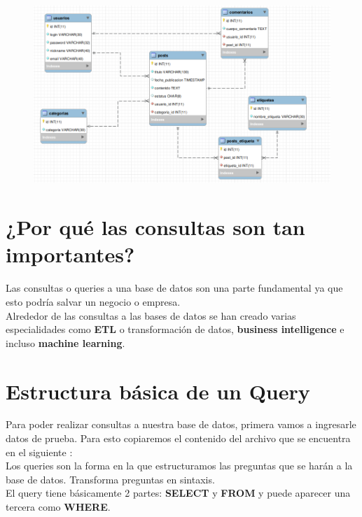 \documentclass{article}
\begin{document}
\newpage

\begin{figure}[h!]
  \centering
  \includegraphics[scale=0.55]{./Pictures/077_diag_fisico_workbench.png}
\end{figure}


\section{¿Por qué las consultas son tan importantes?}%
Las consultas o queries a una base de datos son una parte fundamental ya que
esto podría salvar un negocio o empresa.\\

Alrededor de las consultas a las bases de datos se han creado varias
especialidades como \textbf{ETL} o transformación de datos, \textbf{business
intelligence} e incluso \textbf{machine learning}.

\section{Estructura básica de un Query}%
Para poder realizar consultas a nuestra base de datos, primera vamos a
ingresarle datos de prueba. Para esto copiaremos el contenido del archivo que se encuentra en el siguiente :\\

Los queries son la forma en la que estructuramos las preguntas que se harán a
la base de datos. Transforma preguntas en sintaxis.\\

El query tiene básicamente 2 partes: \textbf{SELECT} y \textbf{FROM} y puede
aparecer una tercera como \textbf{WHERE}.\\
\end{document}
